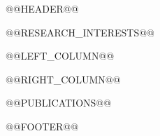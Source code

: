 \documentclass[UTF8,a4paper,10pt,fontset=fandol]{ctexart}
\begin{document}
\small
@@HEADER@@

@@RESEARCH_INTERESTS@@

\noindent\begin{minipage}[t]{0.485\textwidth}
@@LEFT_COLUMN@@
\end{minipage}\hfill
\begin{minipage}[t]{0.485\textwidth}
@@RIGHT_COLUMN@@
\end{minipage}

@@PUBLICATIONS@@

@@FOOTER@@
\end{document}
